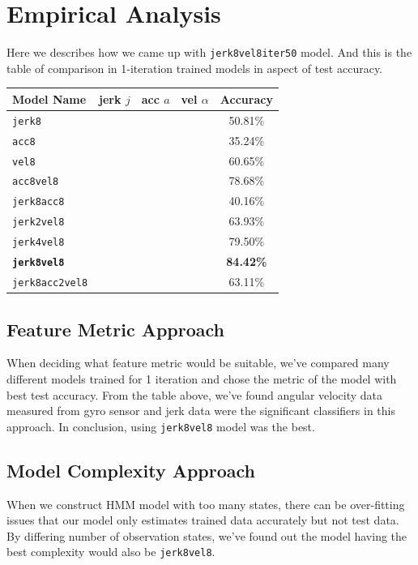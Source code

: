 \documentclass[10pt,letterpaper]{article}
\newcommand*\OK{\checkmark}
\newcommand*\BOLDOK{\ding{51}}
\begin{document}
\section{Empirical Analysis}

Here we describes how we came up with \texttt{jerk8vel8iter50} model. And this is the table of comparison in 1-iteration trained models in aspect of test accuracy.

{\centering
\begin{tabular}{ p{3cm}| ccc | c}
 \hline
 Model Name & jerk $j$ & acc $a$ & vel $\alpha$ & Accuracy \\
 \hline
 \texttt{jerk8} & \OK & & & 50.81\% \\
 \texttt{acc8} & & \OK & & 35.24\% \\
 \texttt{vel8} & & & \OK & 60.65\% \\
 \texttt{acc8vel8} & & \OK & \OK & 78.68\% \\
 \texttt{jerk8acc8} & \OK & \OK & & 40.16\% \\
 \texttt{jerk2vel8} & \OK & & \OK & 63.93\% \\
 \texttt{jerk4vel8} & \OK & & \OK & 79.50\% \\
 \texttt{\textbf{jerk8vel8}} & \BOLDOK & & \BOLDOK & \textbf{84.42\%} \\
 \texttt{jerk8acc2vel8} & \OK & \OK & \OK & 63.11\% \\
 \hline
\end{tabular}
}

\subsection{Feature Metric Approach}
When deciding what feature metric would be suitable, we've compared many different models trained for 1 iteration and chose the metric of the model with best test accuracy. From the table above, we've found angular velocity data measured from gyro sensor and jerk data were the significant classifiers in this approach. In conclusion, using \texttt{jerk8vel8} model was the best.

\subsection{Model Complexity Approach}
When we construct HMM model with too many states, there can be over-fitting issues that our model only estimates trained data accurately but not test data. By differing number of observation states, we've found out the model having the best complexity would also be \texttt{jerk8vel8}.
\end{document}
